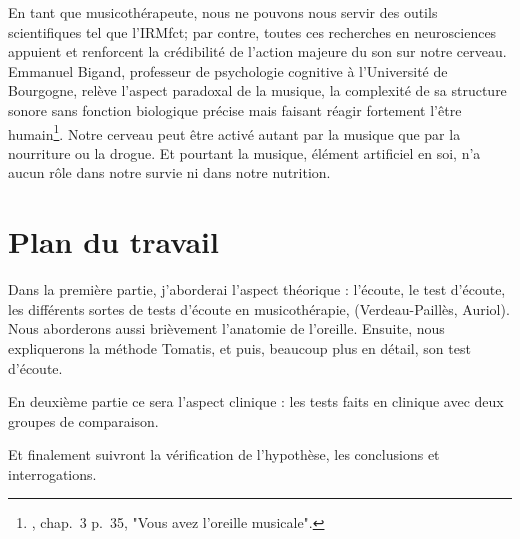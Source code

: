 En tant que musicothérapeute, nous ne pouvons nous servir des outils
scientifiques tel que l'IRMfct; par contre, toutes ces recherches en
neurosciences appuient et renforcent la crédibilité de l'action
majeure du son sur notre cerveau.  Emmanuel Bigand, professeur de
psychologie cognitive à l'Université de Bourgogne, relève l'aspect
paradoxal de la musique, la complexité de sa structure sonore sans
fonction biologique précise mais faisant réagir fortement l'être
humain\footnote{\cite{AuteurInconnu2011}, chap.~3 p.~35, "Vous avez l'oreille musicale".}.  Notre cerveau peut être activé autant par
la musique que par la nourriture ou la drogue. Et pourtant la musique,
élément artificiel en soi, n'a aucun rôle dans notre survie ni dans
notre nutrition.


\section{Plan du travail}

Dans la première partie, j'aborderai l'aspect théorique : l'écoute, le test d'écoute, les différents sortes de tests d'écoute en musicothérapie, (Verdeau-Paillès, Auriol). Nous aborderons aussi brièvement l'anatomie de l'oreille. Ensuite, nous expliquerons la méthode Tomatis,
et puis, beaucoup plus en détail, son test d'écoute.

En deuxième partie ce sera l'aspect clinique : les tests faits en clinique avec deux groupes de
comparaison.

Et finalement suivront la vérification de l'hypothèse, les conclusions et interrogations.
